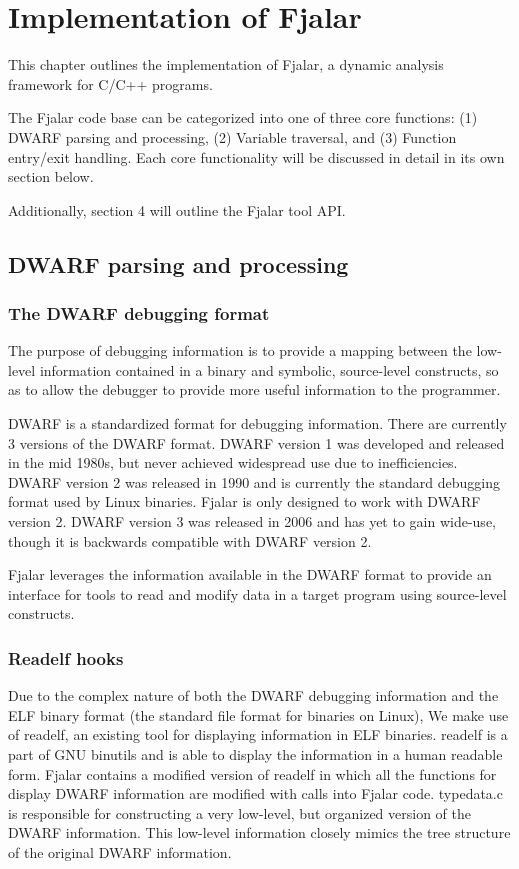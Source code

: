 \documentclass[11pt]{report}
\begin{document}
\chapter{Implementation of Fjalar}
This chapter outlines the implementation of Fjalar, a dynamic analysis
framework for C/C++ programs. 

The Fjalar code base can be categorized into one of three core
functions: (1) DWARF parsing and processing, (2) Variable
traversal, and (3) Function entry/exit handling. Each core
functionality will be discussed in detail in its own section below.

Additionally, section 4 will outline the Fjalar tool API.

\section{DWARF parsing and processing}

\subsection{The DWARF debugging format}
The purpose of debugging information is to provide a mapping between
the low-level information contained in a binary and symbolic,
source-level constructs, so as to allow the debugger to provide more
useful information to the programmer.

DWARF is a standardized format for debugging information. There are currently
3 versions of the DWARF format. DWARF version 1 was developed and
released in the mid 1980s, but never achieved widespread use due to
inefficiencies. DWARF version 2 was released in 1990 and is currently
the standard debugging format used by Linux binaries. Fjalar is
only designed to work with DWARF version 2. DWARF version 3 was
released in 2006 and has yet to gain wide-use, though it is backwards
compatible with DWARF version 2.

Fjalar leverages the information available in the DWARF format to
provide an interface for tools to read and modify data in a target
program using source-level constructs.


\subsection{Readelf hooks}
Due to the complex nature of both the DWARF debugging information and
the ELF binary format (the standard file format for binaries on Linux),
We make use of readelf, an existing tool for displaying information in
ELF binaries. readelf is a part of GNU binutils and is able to display
the information in a human readable form. Fjalar contains a modified
version of readelf in which all the functions for display DWARF
information are modified with calls into Fjalar code. typedata.c is
responsible for constructing a very low-level, but organized version
of the DWARF information. This low-level information closely mimics
the tree structure of the original DWARF information.
\end{document}
